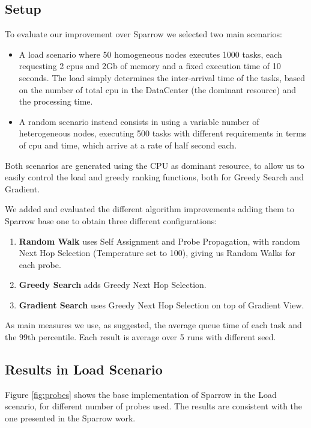 \documentclass[conference]{IEEEtran}
\begin{document}
\subsection{Setup}
To evaluate our improvement over Sparrow we selected two main scenarios:
\begin{itemize}

\item A load scenario where 50 homogeneous nodes executes 1000 tasks, each requesting 2 cpus and 2Gb of memory and a fixed execution time of 10 seconds.
The load simply determines the inter-arrival time of the tasks, based on the number of total cpu in the DataCenter (the dominant resource) and the processing time.

\item A random scenario instead consists in using  a variable number of heterogeneous nodes, executing 500 tasks with different requirements in terms of cpu and time, which arrive at a rate of half second each.

\end{itemize}

Both scenarios are generated using the CPU as dominant resource, to allow us to easily control the load and greedy ranking functions, both for Greedy Search and Gradient.

We added and evaluated the different algorithm improvements adding them to Sparrow base one to obtain three different configurations: 
\begin{enumerate}
\item \textbf{Random Walk} uses Self Assignment and Probe Propagation, with random Next Hop Selection (Temperature set to 100), giving us Random Walks for each probe. 
\item \textbf{Greedy Search} adds Greedy Next Hop Selection.
\item \textbf{Gradient Search} uses Greedy Next Hop Selection on top of Gradient View.
\end{enumerate}

As main measures we use, as suggested, the average queue time of each task and the 99th percentile.
Each result is average over 5 runs with different seed.

\subsection{Results in Load Scenario}

Figure \ref{fig:probes} shows the base implementation of Sparrow in the Load scenario, for different number of probes used. The results are consistent with the one presented in the Sparrow work.
\end{document}
